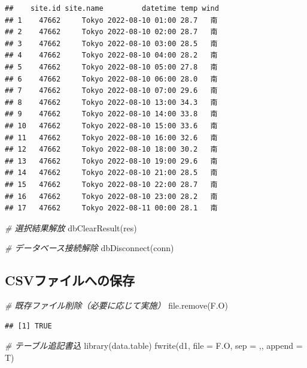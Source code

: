 \documentclass[
]{article}
\newenvironment{Shaded}{\begin{snugshade}}{\end{snugshade}}
\newcommand{\AttributeTok}[1]{\textcolor[rgb]{0.77,0.63,0.00}{#1}}
\newcommand{\CommentTok}[1]{\textcolor[rgb]{0.56,0.35,0.01}{\textit{#1}}}
\newcommand{\FunctionTok}[1]{\textcolor[rgb]{0.00,0.00,0.00}{#1}}
\newcommand{\NormalTok}[1]{#1}
\newcommand{\StringTok}[1]{\textcolor[rgb]{0.31,0.60,0.02}{#1}}
\begin{document}
\begin{verbatim}
##    site.id site.name         datetime temp wind
## 1    47662     Tokyo 2022-08-10 01:00 28.7   南
## 2    47662     Tokyo 2022-08-10 02:00 28.7   南
## 3    47662     Tokyo 2022-08-10 03:00 28.5   南
## 4    47662     Tokyo 2022-08-10 04:00 28.2   南
## 5    47662     Tokyo 2022-08-10 05:00 27.8   南
## 6    47662     Tokyo 2022-08-10 06:00 28.0   南
## 7    47662     Tokyo 2022-08-10 07:00 29.6   南
## 8    47662     Tokyo 2022-08-10 13:00 34.3   南
## 9    47662     Tokyo 2022-08-10 14:00 33.8   南
## 10   47662     Tokyo 2022-08-10 15:00 33.6   南
## 11   47662     Tokyo 2022-08-10 16:00 32.6   南
## 12   47662     Tokyo 2022-08-10 18:00 30.2   南
## 13   47662     Tokyo 2022-08-10 19:00 29.6   南
## 14   47662     Tokyo 2022-08-10 21:00 28.5   南
## 15   47662     Tokyo 2022-08-10 22:00 28.7   南
## 16   47662     Tokyo 2022-08-10 23:00 28.2   南
## 17   47662     Tokyo 2022-08-11 00:00 28.1   南
\end{verbatim}

\begin{Shaded}
\begin{Highlighting}[]
\CommentTok{\# 選択結果解放}
\FunctionTok{dbClearResult}\NormalTok{(res)}

\CommentTok{\# データベース接続解除 }
\FunctionTok{dbDisconnect}\NormalTok{(conn)}
\end{Highlighting}
\end{Shaded}

\hypertarget{csvux30d5ux30a1ux30a4ux30ebux3078ux306eux4fddux5b58}{%
\subsection{CSVファイルへの保存}\label{csvux30d5ux30a1ux30a4ux30ebux3078ux306eux4fddux5b58}}

\begin{Shaded}
\begin{Highlighting}[]
\CommentTok{\# 既存ファイル削除（必要に応じて実施）}
\FunctionTok{file.remove}\NormalTok{(F.O)}
\end{Highlighting}
\end{Shaded}

\begin{verbatim}
## [1] TRUE
\end{verbatim}

\begin{Shaded}
\begin{Highlighting}[]
\CommentTok{\# テーブル追記書込}
\FunctionTok{library}\NormalTok{(data.table)}
\FunctionTok{fwrite}\NormalTok{(d1, }\AttributeTok{file =}\NormalTok{ F.O, }\AttributeTok{sep =} \StringTok{\textquotesingle{},\textquotesingle{}}\NormalTok{, }\AttributeTok{append =}\NormalTok{ T)}
\end{Highlighting}
\end{Shaded}
\end{document}
